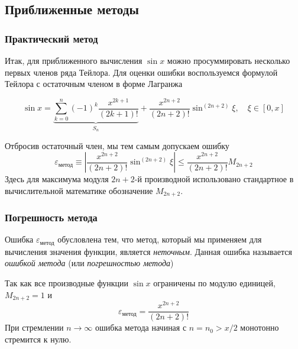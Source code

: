 \documentclass[aspectratio=43,unicode]{beamer}
\begin{document}
\subsection{Приближенные методы}
\begin{frame}
\frametitle{Практический метод}
	Итак, для приближенного вычисления $\sin x$ можно просуммировать
	несколько первых членов ряда Тейлора. Для оценки ошибки воспользуемся
	формулой Тейлора с остаточным членом в форме Лагранжа

	\[
	\sin x = \underbrace{\sum_{k=0}^{n} (-1)^k \frac{x^{2k+1}}{(2k+1)!}}_{S_n} +
	\frac{x^{2n+2}}{(2n+2)!}\sin^{(2n+2)} \xi,
	\quad \xi \in [0, x]
	\]

	\pause

	Отбросив остаточный член, мы тем самым допускаем ошибку
	\[
	\varepsilon_{\text{метод}}\equiv
	\left|\frac{x^{2n+2}}{(2n+2)!}\sin^{(2n+2)} \xi \right| \leqslant
	\frac{x^{2n+2}}{(2n+2)!}M_{2n+2}
	\]
	Здесь для максимума модуля $2n+2$-й производной использовано стандартное в
	вычислительной математике обозначение $M_{2n+2}$.
\end{frame}

\begin{frame}
\frametitle{Погрешность метода}
	Ошибка $\varepsilon_{\text{метод}}$ обусловлена тем, что метод, который мы
	применяем для вычисления значения функции, является \emph{неточным}.
	Данная ошибка называется \emph{ошибкой метода} (или \emph{погрешностью метода})

	\pause

	Так как все производные функции $\sin x$ ограничены по модулю единицей, $M_{2n+2} = 1$ и
	\[
	\varepsilon_{\text{метод}} = \frac{x^{2n+2}}{(2n+2)!}
	\]
	При стремлении $n \rightarrow \infty$ ошибка метода начиная с $n = n_0 >
	x/2$ монотонно стремится к нулю.
\end{frame}
\end{document}
